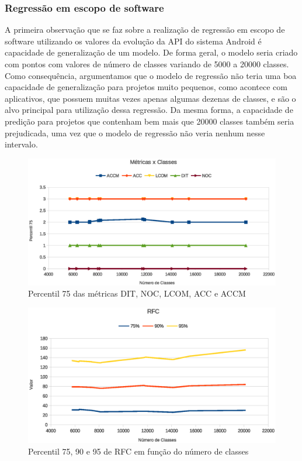 \subsubsection{Regressão em escopo de software}

A primeira observação que se faz sobre a realização de regressão em escopo de software utilizando os valores da evolução da API do sistema Android é capacidade de generalização de um modelo. De forma geral, o modelo seria criado com pontos com valores de número de classes variando de 5000 a 20000 classes. Como consequência, argumentamos que o modelo de regressão não teria uma boa capacidade de generalização para projetos muito pequenos, como acontece com aplicativos, que possuem muitas vezes apenas algumas dezenas de classes, e são o alvo principal para utilização dessa regressão. Da mesma forma, a capacidade de predição para projetos que contenham bem mais que 20000 classes também seria prejudicada, uma vez que o modelo de regressão não veria nenhum nesse intervalo. 

\begin{figure}[!htb]
\centering
\includegraphics [keepaspectratio=true,scale=0.7]{figuras/metricasxclasses.eps}
\caption{Percentil 75 das métricas DIT, NOC, LCOM, ACC e ACCM}
\label{fig:metricasxclasses}
\end{figure}

\begin{figure}[!htb]
\centering
\includegraphics [keepaspectratio=true,scale=0.7]{figuras/rfcxclasses.eps}
\caption{Percentil 75, 90 e 95 de RFC em função do número de classes}
\label{fig:rfcxclasses}
\end{figure}

